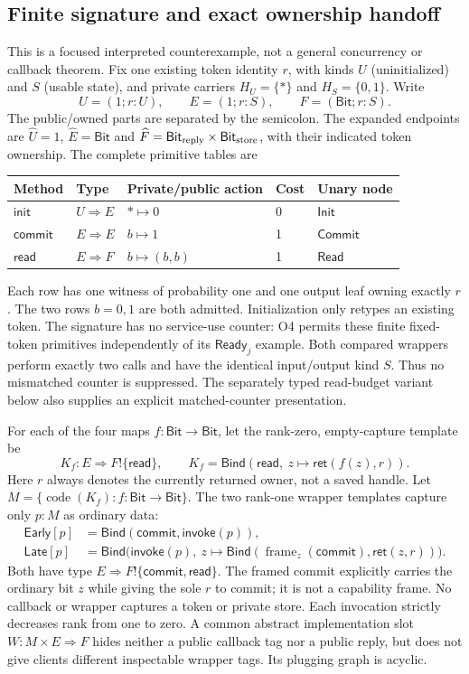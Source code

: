 \documentclass[11pt,a4paper]{article}
\theoremstyle{definition}
\newcommand{\Ret}{\mathsf{ret}}
\newcommand{\Bind}{\mathsf{Bind}}
\newcommand{\Invoke}{\mathsf{invoke}}
\begin{document}
\subsection{Finite signature and exact ownership handoff}
This is a focused interpreted counterexample, not a general concurrency
or callback theorem. Fix one existing token identity $r$, with kinds
$U$ (uninitialized) and $S$ (usable state), and private carriers
$H_U=\{*\}$ and $H_S=\{0,1\}$. Write
\[
U=(1;r:U),\qquad E=(1;r:S),\qquad F=(\mathsf{Bit};r:S).
\]
The public/owned parts are separated by the semicolon. The expanded
endpoints are $\widehat U=1$, $\widehat E=\mathsf{Bit}$ and
$\widehat F=\mathsf{Bit}_{\rm reply}\times\mathsf{Bit}_{\rm store}$,
with their indicated token ownership. The complete primitive tables are
\begin{center}
\begin{tabular}{@{}lllll@{}}
\toprule Method&Type&Private/public action&Cost&Unary node\\\midrule
$\mathsf{init}$&$U\Rightarrow E$&$*\mapsto0$&0&$\mathsf{Init}$\\
$\mathsf{commit}$&$E\Rightarrow E$&$b\mapsto1$&1&$\mathsf{Commit}$\\
$\mathsf{read}$&$E\Rightarrow F$&$b\mapsto(b,b)$&1&$\mathsf{Read}$\\
\bottomrule
\end{tabular}
\end{center}
Each row has one witness of probability one and one output leaf owning
exactly $r$. The two rows $b=0,1$ are both admitted. Initialization only
retypes an existing token. The signature has no service-use counter:
O4 permits these finite fixed-token primitives independently of its
$\mathsf{Ready}_j$ example. Both compared wrappers perform exactly two
calls and have the identical input/output kind $S$. Thus no mismatched
counter is suppressed. The separately typed read-budget variant below
also supplies an explicit matched-counter presentation.

For each of the four maps $f:\mathsf{Bit}\to\mathsf{Bit}$, let the
rank-zero, empty-capture template be
\[
K_f:E\Rightarrow F!\{\mathsf{read}\},\qquad
K_f=\Bind(\mathsf{read},\ z\mapsto\Ret(f(z),r)).
\]
Here $r$ always denotes the currently returned owner, not a saved handle.
Let $M=\{\operatorname{code}(K_f):f:\mathsf{Bit}\to\mathsf{Bit}\}$.
The two rank-one wrapper templates capture only $p:M$ as ordinary data:
\begin{align*}
\mathsf{Early}[p]&=\Bind(\mathsf{commit},\Invoke(p)),\\
\mathsf{Late}[p]&=\Bind\bigl(\Invoke(p),\ z\mapsto
 \Bind(\operatorname{frame}_{z}(\mathsf{commit}),\Ret(z,r))\bigr).
\end{align*}
Both have type $E\Rightarrow F!\{\mathsf{commit},\mathsf{read}\}$.
The framed commit explicitly carries the ordinary bit $z$ while giving
the sole $r$ to commit; it is not a capability frame. No callback or
wrapper captures a token or private store. Each invocation strictly
decreases rank from one to zero. A common abstract implementation slot
$W:M\times E\Rightarrow F$ hides neither a public callback tag nor a
public reply, but does not give clients different inspectable wrapper
tags. Its plugging graph is acyclic.
\end{document}
